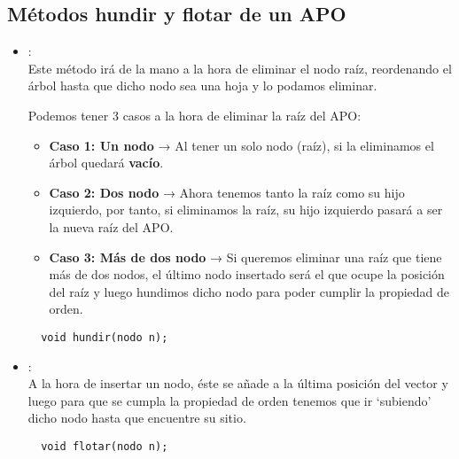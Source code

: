 \subsection*{Métodos hundir y flotar de un APO}
\begin{itemize}
  \item {}:\\
  Este método irá de la mano a la hora de eliminar el nodo raíz, reordenando el árbol hasta que dicho nodo sea una hoja y lo podamos eliminar.

  Podemos tener 3 casos a la hora de eliminar la raíz del APO:
  \begin{itemize}
    \item \textbf{Caso 1: Un nodo} → Al tener un solo nodo (raíz), si la eliminamos el árbol quedará \textbf{vacío}.
    \item \textbf{Caso 2: Dos nodo} → Ahora tenemos tanto la raíz como su hijo izquierdo, por tanto, si eliminamos la raíz, su hijo izquierdo pasará a ser la nueva raíz del APO.
    \item \textbf{Caso 3: Más de dos nodo} → Si queremos eliminar una raíz que tiene más de dos nodos, el último nodo insertado será el que ocupe la posición del raíz y luego hundimos dicho nodo para poder cumplir la propiedad de orden.
  \end{itemize}
  \verb|  void hundir(nodo n);|
  \item {}:\\
  A la hora de insertar un nodo, éste se añade a la última posición del vector y luego para que se cumpla la propiedad de orden tenemos que ir `subiendo' dicho nodo hasta que encuentre su sitio.

  \verb|  void flotar(nodo n);|
\end{itemize}